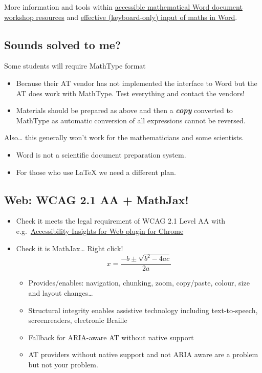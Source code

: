 \documentclass[
  10pt,
  a4paper]{article}
\providecommand{\tightlist}{%
  \setlength{\itemsep}{0pt}\setlength{\parskip}{0pt}}
\begin{document}
More information and tools within \href{https://stem-enable.github.io/WordWorkshop/}{accessible mathematical Word document workshop resources} and \href{https://bathmash.github.io/gettingstarted/Word/index.html}{effective (keyboard-only) input of maths in Word}.

\hypertarget{sounds-solved-to-me}{%
\subsection{Sounds solved to me?}\label{sounds-solved-to-me}}

Some students will require MathType format

\begin{itemize}
\tightlist
\item
  Because their AT vendor has not implemented the interface to Word but the AT does work with MathType. Test everything and contact the vendors!
\item
  Materials should be prepared as above and then a \textbf{\emph{copy}} converted to MathType as automatic conversion of all expressions cannot be reversed.
\end{itemize}

Also\ldots{} this generally won't work for the mathematicians and some scientists.

\begin{itemize}
\tightlist
\item
  Word is not a scientific document preparation system.
\item
  For those who use LaTeX we need a different plan.
\end{itemize}

\hypertarget{web-wcag-2.1-aa-mathjax}{%
\subsection{Web: WCAG 2.1 AA + MathJax!}\label{web-wcag-2.1-aa-mathjax}}

\begin{itemize}
\item
  Check it meets the legal requirement of WCAG 2.1 Level AA with e.g.~\href{https://accessibilityinsights.io/docs/en/web/overview}{Accessibility Insights for Web plugin for Chrome}
\item
  Check it is MathJax\ldots{} Right click!
  \[x = \frac{-b\pm\sqrt{b^2 - 4ac}}{2a}\]

  \begin{itemize}
  \tightlist
  \item
    Provides/enables: navigation, chunking, zoom, copy/paste, colour, size and layout changes\ldots{}
  \item
    Structural integrity enables assistive technology including text-to-speech, screenreaders, electronic Braille
  \item
    Fallback for ARIA-aware AT without native support
  \item
    AT providers without native support and not ARIA aware are a problem but not your problem.
  \end{itemize}
\end{itemize}
\end{document}

